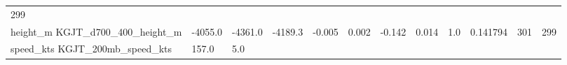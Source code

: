 \documentclass[11pt]{article}
\begin{document}
\begin{longtable}[]{@{}llllllllllll@{}}
\begin{minipage}[t]{0.07\columnwidth}
299\strut
\end{minipage}\tabularnewline
\begin{minipage}[t]{0.18\columnwidth}\raggedright\strut
height\_m KGJT\_d700\_400\_height\_m\strut
\end{minipage} & \begin{minipage}[t]{0.04\columnwidth}\raggedright\strut
-4055.0\strut
\end{minipage} & \begin{minipage}[t]{0.04\columnwidth}\raggedright\strut
-4361.0\strut
\end{minipage} & \begin{minipage}[t]{0.04\columnwidth}\raggedright\strut
-4189.3\strut
\end{minipage} & \begin{minipage}[t]{0.04\columnwidth}\raggedright\strut
-0.005\strut
\end{minipage} & \begin{minipage}[t]{0.05\columnwidth}\raggedright\strut
0.002\strut
\end{minipage} & \begin{minipage}[t]{0.04\columnwidth}\raggedright\strut
-0.142\strut
\end{minipage} & \begin{minipage}[t]{0.04\columnwidth}\raggedright\strut
0.014\strut
\end{minipage} & \begin{minipage}[t]{0.05\columnwidth}\raggedright\strut
1.0\strut
\end{minipage} & \begin{minipage}[t]{0.05\columnwidth}\raggedright\strut
0.141794\strut
\end{minipage} & \begin{minipage}[t]{0.05\columnwidth}\raggedright\strut
301\strut
\end{minipage} & \begin{minipage}[t]{0.07\columnwidth}\raggedright\strut
299\strut
\end{minipage}\tabularnewline
\begin{minipage}[t]{0.18\columnwidth}\raggedright\strut
speed\_kts KGJT\_200mb\_speed\_kts\strut
\end{minipage} & \begin{minipage}[t]{0.04\columnwidth}\raggedright\strut
157.0\strut
\end{minipage} & \begin{minipage}[t]{0.04\columnwidth}\raggedright\strut
5.0\strut
\end{minipage} & \begin{minipage}[t]{0.04\columnwidth}\raggedright\strut

\end{minipage}
\end{longtable}
\end{document}
